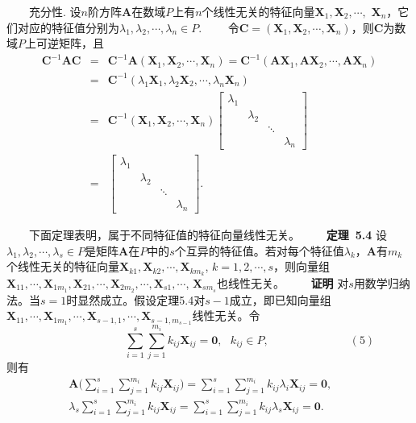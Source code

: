 \documentclass[compress,mathserif,cjk]{beamer}
\theoremstyle{remark}
\numberwithin{equation}{section}
\newcommand{\hei}{\bf}      %
\begin{document}
\begin{CJK}{UTF8}{gbsn}
\begin{frame}\small
\vskip 5pt
\ \ \ \ 充分性. 设$n$阶方阵$\bm A$在数域$P$上有$n$个线性无关的特征向量$\bm X_1,\bm X_2,\cdots,$ $\bm X_n$，它们对应的特征值分别为$\lambda_1,\lambda_2,\cdots,\lambda_n\in P$.
\vskip 5pt
\ \ \ \ 令$\bm C=(\bm X_1,\bm X_2,\cdots,\bm X_n)$，则$\bm C$为数域$P$上可逆矩阵，且
\begin{eqnarray*}
\bm C^{-1}\bm{AC}&=&\bm C^{-1}\bm A(\bm X_1,\bm X_2,\cdots,\bm X_n)=\bm C^{-1}(\bm A\bm X_1,\bm A\bm X_2,\cdots,\bm A\bm X_n)\\
&=&\bm C^{-1}(\lambda_1\bm X_1,\lambda_2\bm X_2,\cdots,\lambda_n\bm X_n) \\
&=&\bm C^{-1}(\bm X_1,\bm X_2,\cdots,\bm X_n)\left[\begin{matrix}\lambda_1&&&\\&\lambda_2&&\\&&\ddots&\\&&&\lambda_n\end{matrix}\right]\\
&=&\left[\begin{matrix}\lambda_1&&&\\&\lambda_2&&\\&&\ddots&\\&&&\lambda_n\end{matrix}\right].
\end{eqnarray*}
\end{frame}


\begin{frame}\small
\ \ \ \ 下面定理表明，属于不同特征值的特征向量线性无关。
\vskip 2pt
\ \ \ \ {\hei 定理~5.4} 设$\lambda_1,\lambda_2,\cdots,\lambda_s\in P$是矩阵$\bm A$在$P$中的$s$个互异的特征值。若对每个特征值$\lambda_k$，$\bm A$有$m_k$个线性无关的特征向量$\bm X_{k1},\bm X_{k2},\cdots,\bm X_{km_k}$, $k=1,2,\cdots,s$，则向量组$\bm X_{11},\cdots,\bm X_{1m_1},\bm X_{21},\cdots,\bm X_{2m_2},\cdots,\bm X_{s1},\cdots$, $\bm X_{sm_s}$也线性无关。
\pause\vskip 5pt
\ \ \ \ {\hei 证明} 对$s$用数学归纳法。当$s=1$时显然成立。假设定理5.4对$s-1$成立，即已知向量组$\bm X_{11},\cdots,\bm X_{1m_1},\cdots,\bm X_{s-1,1},\cdots,\bm X_{s-1,m_{s-1}}$线性无关。令
$$\hspace{3cm}\sum_{i=1}^s\sum_{j=1}^{m_i}k_{ij}\bm X_{ij}=\bm0,~~~k_{ij}\in P,\hspace{3cm}(5)$$
则有
\begin{eqnarray*}
\bm A\Big(\sum_{i=1}^s\sum_{j=1}^{m_i}k_{ij}\bm X_{ij}\Big)=\sum_{i=1}^s\sum_{j=1}^{m_i}k_{ij}\lambda_i\bm{X}_{ij}=\bm0,&&\\
\lambda_s\sum_{i=1}^s\sum_{j=1}^{m_i}k_{ij}\bm X_{ij}=\sum_{i=1}^s\sum_{j=1}^{m_i}k_{ij}\lambda_s\bm X_{ij}=\bm0.&&
\end{eqnarray*}


\end{frame}
\end{CJK}
\end{document}
